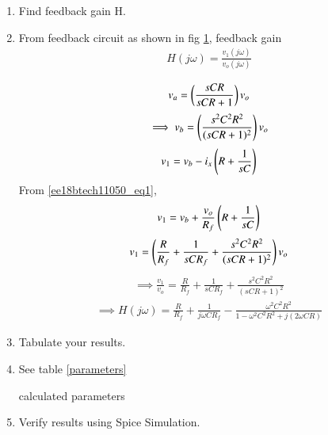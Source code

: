 \begin{enumerate}[label=\arabic*.,ref=\theenumi]
\item Find feedback gain H.
\item \solution From feedback circuit as shown in fig \ref{fig:ee18btech11050_f8}, feedback gain 
\begin{align}
    H(j\omega) = \frac{v_1(j\omega)}{v_o(j\omega)}
\end{align}

\begin{figure}[!ht]
	\begin{center}
		\resizebox{\columnwidth}{!}{}
	\end{center}
\caption{}
\label{fig:ee18btech11050_f8}
\end{figure}

\begin{align}
    v_a = \left(\frac{sCR}{sCR+1}\right)v_o
\end{align}
\begin{align}
    \implies v_b = \left(\frac{s^2C^2R^2}{(sCR+1)^2}\right)v_o
\end{align}
\begin{align}
    v_1 = v_b - i_x\left(R + \frac{1}{sC}\right)
\end{align}
From \eqref{ee18btech11050_eq1},
\begin{align}
    v_1 = v_b + \frac{v_o}{R_f}\left(R + \frac{1}{sC}\right)
\end{align}
\begin{align}
    v_1 = \left(\frac{R}{R_f} + \frac{1}{sCR_f} + \frac{s^2C^2R^2}{(sCR+1)^2}\right)v_o
\end{align}
\begin{align}
    \implies \frac{v_1}{v_o} = \frac{R}{R_f} + \frac{1}{sCR_f} + \frac{s^2C^2R^2}{(sCR+1)^2}
\end{align}
\begin{align}
    \implies H(j\omega) = \frac{R}{R_f} + \frac{1}{j\omega CR_f} - \frac{\omega^2C^2R^2}{1-\omega^2C^2R^2 + j(2\omega CR)}
\end{align}

\item Tabulate your results.
\item \solution See table \ref{parameters}
\begin{table}[!ht]
\centering

\caption{calculated parameters}
\label{parameters}
\end{table}

\item Verify results using Spice Simulation.


\end{enumerate}
